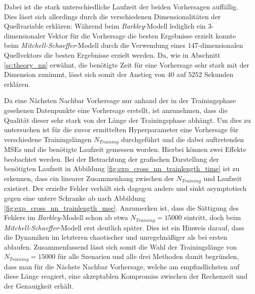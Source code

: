 Dabei ist die stark unterschiedliche Laufzeit der beiden Vorhersagen auffällig. Dies lässt sich allerdings durch die verschiedenen Dimensionalitäten der Quellvariable erklären: Während beim \textit{Barkley}-Modell lediglich ein $3$-dimensionaler Vektor für die Vorhersage die besten Ergebnisse erzielt konnte beim \textit{Mitchell-Schaeffer}-Modell durch die Verwendung eines $147$-dimensionalen Quellvektors die besten Ergebnisse erzielt werden. Da, wie in Abschnitt \ref{sc:theory_nn} erwähnt, die benötigte Zeit für eine Vorhersage sehr stark mit der Dimension zunimmt, lässt sich somit der Anstieg von $40$ auf $5252$ Sekunden erklären.

Da eine Nächsten Nachbar Vorhersage nur anhand der in der Trainingsphase gesehenen Datenpunkte eine Vorhersage erstellt, ist anzunehmen, dass die Qualität dieser sehr stark von der Länge der Trainingsphase abhängt. Um dies zu untersuchen ist für die zuvor ermittelten Hyperparameter eine Vorhersage für verschiedene Trainingslängen $N_{Training}$ durchgeführt und die dabei auftretenden MSEs und die benötigte Laufzeit gemessen worden. Hierbei können zwei Effekte beobachtet werden. Bei der Betrachtung der grafischen Darstellung der benötigten Laufzeit in Abbildung \ref{fig:exp_cross_nn_trainlength_time} ist zu erkennen, dass ein linearer Zusammenhang zwischen der $N_{Training}$ und Laufzeit existiert. Der erzielte Fehler verhält sich dagegen anders und sinkt asymptotisch gegen eine untere Schranke ab nach Abbildung \ref{fig:exp_cross_nn_trainlength_mse}. Anzumerken ist, dass die Sättigung des Fehlers im \textit{Barkley}-Modell schon ab etwa $N_{Training}=15000$ eintritt, doch beim \textit{Mitchell-Schaeffer}-Modell erst deutlich später. Dies ist ein Hinweis darauf, dass die Dynamiken im letzteren chaotischer und unregelmäßiger als bei ersten ablaufen. Zusammenfassend lässt sich somit die Wahl der Trainingslänge von $N_{Training} = 15000$ für alle Szenarien und alle drei Methoden damit begründen, dass man für die Nächste Nachbar Vorhersage, welche am empfindlichsten auf diese Länge reagiert, eine akzeptablen Kompromiss zwischen der Rechenzeit und der Genauigkeit erhält.

